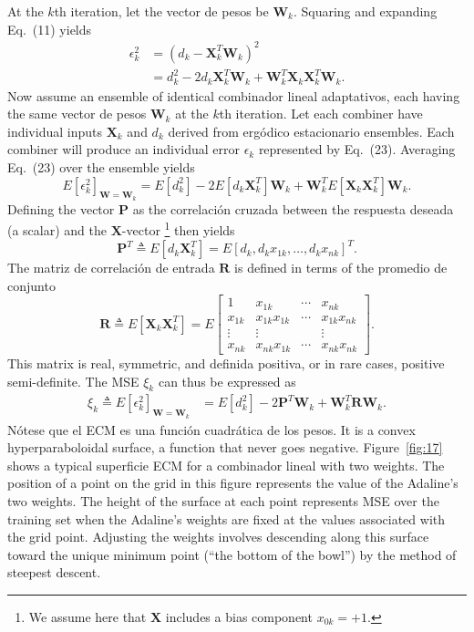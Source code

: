 \documentclass[10pt,twocolumn]{article}
\newcommand{\X}{\bm{X}}
\newcommand{\W}{\bm{W}}
\newcommand{\R}{\bm{R}}
\newcommand{\Pv}{\bm{P}}
\begin{document}
At the $k$th iteration, let the vector de pesos be $\W_k$. Squaring and expanding
Eq.~(11) yields
\begin{align}
\epsilon_k^2 &= (d_k - \X_k^{T}\W_k)^2 \tag{22}\\
&= d_k^2 - 2d_k\X_k^{T}\W_k + \W_k^{T}\X_k\X_k^{T}\W_k. \tag{23}
\end{align}
Now assume an ensemble of identical combinador lineal adaptativos, each having the same
vector de pesos $\W_k$ at the $k$th iteration. Let each combiner have individual
inputs $\X_k$ and $d_k$ derived from ergódico estacionario ensembles. Each combiner
will produce an individual error $\epsilon_k$ represented by Eq.~(23). Averaging
Eq.~(23) over the ensemble yields
\begin{equation}
E[\epsilon_k^2]_{\W=\W_k} = E[d_k^2] - 2E[d_k\X_k^{T}]\W_k + \W_k^{T}E[\X_k\X_k^{T}]\W_k. \tag{24}
\end{equation}
Defining the vector $\Pv$ as the correlación cruzada between the respuesta deseada (a
scalar) and the $\X$-vector%
\footnote{We assume here that $\X$ includes a bias component $x_{0k} = +1$.}
then yields
\begin{equation}
\Pv^{T} \triangleq E[d_k\X_k^{T}] = E[d_k, d_k x_{1k}, \ldots, d_k x_{nk}]^{T}. \tag{25}
\end{equation}
The matriz de correlación de entrada $\R$ is defined in terms of the promedio de conjunto
\begin{equation}
\R \triangleq E[\X_k\X_k^{T}]
= E\!\begin{bmatrix}
1 & x_{1k} & \cdots & x_{nk}\\
x_{1k} & x_{1k}x_{1k} & \cdots & x_{1k}x_{nk}\\
\vdots & \vdots & & \vdots\\
x_{nk} & x_{nk}x_{1k} & \cdots & x_{nk}x_{nk}
\end{bmatrix}. \tag{26}
\end{equation}
This matrix is real, symmetric, and definida positiva, or in rare cases, positive
semi-definite. The MSE $\xi_k$ can thus be expressed as
\begin{align}
\xi_k \triangleq E[\epsilon_k^2]_{\W=\W_k}
&= E[d_k^2] - 2\Pv^{T}\W_k + \W_k^{T}\R\W_k. \tag{27}
\end{align}
Nótese que el ECM es una función cuadrática de los pesos. It is a convex
hyperparaboloidal surface, a function that never goes negative. Figure~\ref{fig:17}
shows a typical superficie ECM for a combinador lineal with two weights. The position of
a point on the grid in this figure represents the value of the Adaline's two
weights. The height of the surface at each point represents MSE over the training
set when the Adaline's weights are fixed at the values associated with the grid
point. Adjusting the weights involves descending along this surface toward the
unique minimum point (``the bottom of the bowl'') by the method of steepest
descent.
\end{document}
